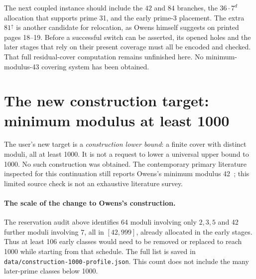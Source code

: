 \documentclass[11pt]{article}
\begin{document}
The next coupled instance should include the $42$ and $84$ branches,
the $36\cdot7^d$ allocation that supports prime 31, and the early
prime-3 placement. The extra $81^\uparrow$ is another candidate for
relocation, as Owens himself suggests on printed pages 18--19. Before a
successful switch can be asserted, its opened holes and the later stages
that rely on their present coverage must all be encoded and checked.
That full residual-cover computation remains unfinished here. No
minimum-modulus-43 covering system has been obtained.

\section{The new construction target: minimum modulus at least 1000}
The user's new target is a \emph{construction lower bound}: a finite
cover with distinct moduli, all at least 1000. It is not a request to
lower a universal upper bound to 1000. No such construction was obtained.
The contemporary primary literature inspected for this continuation still
reports Owens's minimum modulus 42~\cite{agrawal}; this limited source
check is not an exhaustive literature survey.

\paragraph{The scale of the change to Owens's construction.}
The reservation audit above identifies 64 moduli involving only $2,3,5$
and 42 further moduli involving $7$, all in $[42,999]$, already allocated
in the early stages. Thus at least 106 early classes would need to be
removed or replaced to reach 1000 while starting from that schedule.
The full list is saved in \texttt{data/construction-1000-profile.json}.
This count does not include the many later-prime classes below 1000.
\end{document}
